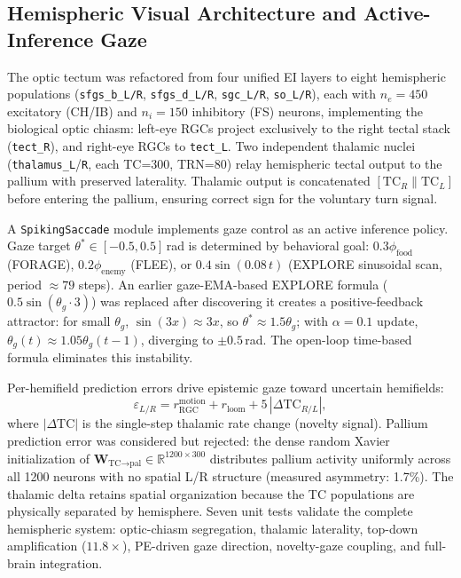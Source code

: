 \documentclass[11pt,a4paper]{article}
\begin{document}
\subsection{Hemispheric Visual Architecture and Active-Inference Gaze}

The optic tectum was refactored from four unified EI layers to eight hemispheric populations (\texttt{sfgs\_b\_L/R}, \texttt{sfgs\_d\_L/R}, \texttt{sgc\_L/R}, \texttt{so\_L/R}), each with $n_e = 450$ excitatory (CH/IB) and $n_i = 150$ inhibitory (FS) neurons, implementing the biological optic chiasm: left-eye RGCs project exclusively to the right tectal stack (\texttt{tect\_R}), and right-eye RGCs to \texttt{tect\_L}. Two independent thalamic nuclei (\texttt{thalamus\_L}/\texttt{R}, each TC=300, TRN=80) relay hemispheric tectal output to the pallium with preserved laterality. Thalamic output is concatenated $[\text{TC}_R \| \text{TC}_L]$ before entering the pallium, ensuring correct sign for the voluntary turn signal.

A \texttt{SpikingSaccade} module implements gaze control as an active inference policy. Gaze target $\theta^* \in [-0.5, 0.5]$\,rad is determined by behavioral goal: $0.3\phi_\text{food}$ (FORAGE), $0.2\phi_\text{enemy}$ (FLEE), or $0.4\sin(0.08\,t)$ (EXPLORE sinusoidal scan, period $\approx 79$ steps). An earlier gaze-EMA-based EXPLORE formula ($0.5\sin(\theta_g \cdot 3)$) was replaced after discovering it creates a positive-feedback attractor: for small $\theta_g$, $\sin(3x)\approx 3x$, so $\theta^* \approx 1.5\theta_g$; with $\alpha=0.1$ update, $\theta_g(t) \approx 1.05\theta_g(t{-}1)$, diverging to $\pm 0.5$\,rad. The open-loop time-based formula eliminates this instability.

Per-hemifield prediction errors drive epistemic gaze toward uncertain hemifields:
\begin{equation}
  \varepsilon_{L/R} = r_\text{RGC}^\text{motion} + r_\text{loom} + 5\,|\Delta\text{TC}_{R/L}|,
\end{equation}
where $|\Delta\text{TC}|$ is the single-step thalamic rate change (novelty signal). Pallium prediction error was considered but rejected: the dense random Xavier initialization of $\mathbf{W}_{\text{TC}\to\text{pal}} \in \mathbb{R}^{1200\times 300}$ distributes pallium activity uniformly across all 1200 neurons with no spatial L/R structure (measured asymmetry: 1.7\%). The thalamic delta retains spatial organization because the TC populations are physically separated by hemisphere. Seven unit tests validate the complete hemispheric system: optic-chiasm segregation, thalamic laterality, top-down amplification ($11.8\times$), PE-driven gaze direction, novelty-gaze coupling, and full-brain integration.
\end{document}
